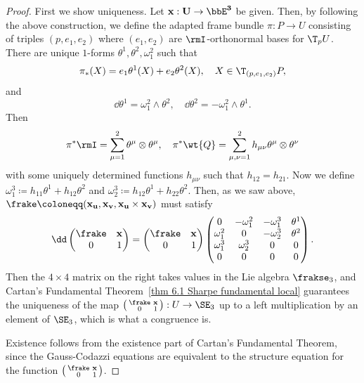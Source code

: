 \begin{proof}
    First we show uniqueness. Let $\bf{x}:U\to \bbE^3$ be given. Then, by following the above construction, we define the adapted frame bundle $\pi:P\to U$ consisting of triples $(p,e_1,e_2)$ where $(e_1,e_2)$ are $\rmI$-orthonormal bases for $\T_p U$. There are unique $1$-forms $\theta^1,\theta^2,\omega_1^2$ such that 
    \[\pi_\ast(X)=e_1\theta^1(X)+e_2\theta^2(X),\quad X\in \T_{(p,e_1,e_2)}P,\]
    and
    \[\dd\theta^1=\omega_1^2\wedge \theta^2,\quad \dd\theta^2=-\omega_1^2\wedge\theta^1.\]
    Then 
    \[\pi^\ast\rmI=\sum_{\mu=1}^2\theta^\mu\otimes\theta^\mu,\quad \pi^\ast \wt{Q}=\sum_{\mu,\nu=1}^2 h_{\mu\nu}\theta^\mu\otimes\theta^\nu\]
    with some uniquely determined functions $h_{\mu\nu}$ such that $h_{12}=h_{21}$. Now we define $\omega_1^3\coloneqq h_{11}\theta^1+h_{12}\theta^2$ and $\omega_2^3\coloneqq h_{12}\theta^1+h_{22}\theta^2$. Then, as we saw above, $\frake\coloneqq(\bf{x}_u,\bf{x}_v,\bf{x}_u\times \bf{x}_v)$ must satisfy 
    \[\dd \begin{pmatrix}
        \frake & \bf{x}\\
        0& 1
    \end{pmatrix}=\begin{pmatrix}
        \frake & \bf{x}\\
        0& 1
    \end{pmatrix}
    \begin{pmatrix}
        0 & -\omega_1^2 & -\omega_1^3& \theta^1\\
        \omega_1^2 & 0 & -\omega_2^3 & \theta^2\\
        \omega_1^3 & \omega_2^3 & 0 & 0\\
        0 & 0& 0& 0
    \end{pmatrix}.
    \]
    Then the $4\times 4$ matrix on the right takes values in the Lie algebra $\frakse_3$, and Cartan's Fundamental Theorem~\ref{thm 6.1 Sharpe fundamental local} guarantees the uniqueness of the map $\left(\begin{smallmatrix}
        \frake & \bf{x}\\
        0& 1
    \end{smallmatrix}\right): U\to \SE_3$ up to a left multiplication by an element of $\SE_3$, which is what a congruence is.

    Existence follows from the existence part of Cartan's Fundamental Theorem, since the Gauss-Codazzi equations are equivalent to the structure equation for the function $\left(\begin{smallmatrix}
        \frake & \bf{x}\\
        0& 1
    \end{smallmatrix}\right)$.
\end{proof}

